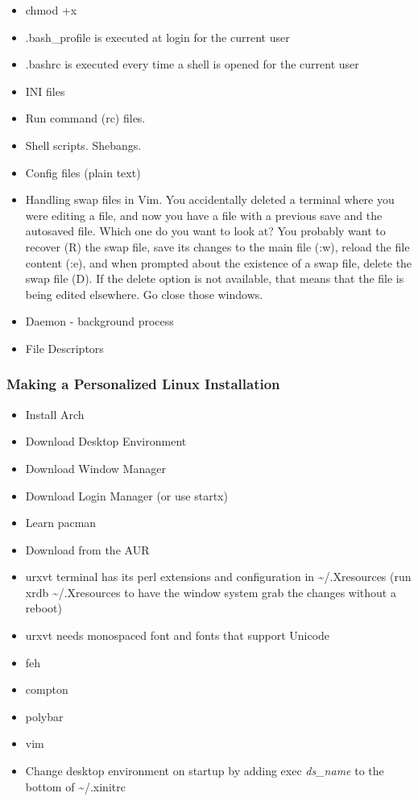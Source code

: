 \begin{itemize}
	\item chmod +x
	\item .bash\_profile is executed at login for the current user
	\item .bashrc is executed every time a shell is opened for the current user
	\item INI files
	\item Run command (rc) files.
	\item Shell scripts. Shebangs.
	\item Config files (plain text)
	\item Handling swap files in Vim. You accidentally deleted a terminal where you were editing a file, and now you have a file with a previous save and the autosaved file. Which one do you want to look at? You probably want to recover (R) the swap file, save its changes to the main file (:w), reload the file content (:e), and when prompted about the existence of a swap file, delete the swap file (D). If the delete option is not available, that means that the file is being edited elsewhere. Go close those windows.
	\item Daemon - background process
	\item File Descriptors
\end{itemize}

\subsubsection{Making a Personalized Linux Installation}


\begin{itemize}
	\item Install Arch
	\item Download Desktop Environment
	\item Download Window Manager
	\item Download Login Manager (or use startx)
	\item Learn pacman
	\item Download from the AUR
	\item urxvt terminal has its perl extensions and configuration in \textasciitilde/.Xresources (run xrdb \textasciitilde/.Xresources to have the window system grab the changes without a reboot)
	\item urxvt needs monospaced font and fonts that support Unicode
	\item feh
	\item compton
	\item polybar
	\item vim
	\item Change desktop environment on startup by adding exec \textit{ds\_name} to the bottom of \textasciitilde/.xinitrc
\end{itemize}

